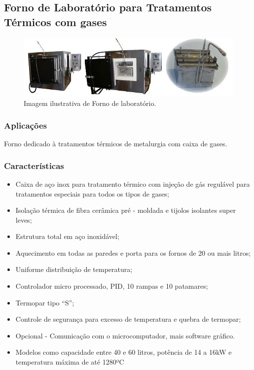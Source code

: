 \subsection{Forno de Laboratório para Tratamentos Térmicos com gases}

\begin{figure}[!h]
	\centering
	\label{forno_gases}
	\includegraphics[keepaspectratio=true,scale=0.8]{figuras/forno_gases.JPG}
	\caption{Imagem ilustrativa de Forno de laboratório.}
\end{figure}

\subsubsection{Aplicações}

Forno dedicado à tratamentos térmicos de metalurgia com caixa de gases.

\subsubsection{Características}

\begin{itemize}
	\item Caixa de aço inox para tratamento térmico com injeção de gás regulável para tratamentos especiais para todos os tipos de gases;
	\item Isolação térmica de fibra cerâmica pré - moldada e tijolos isolantes super leves;
	\item Estrutura total em aço inoxidável;
	\item Aquecimento em todas as paredes e porta para os fornos de 20 ou mais litros;
	\item Uniforme distribuição de temperatura;
	\item Controlador micro processado, PID, 10 rampas e 10 patamares;
	\item Termopar tipo “S”;
	\item Controle de segurança para excesso de temperatura e quebra de termopar;
	\item Opcional - Comunicação com o microcomputador, mais software gráfico.
	\item Modelos como capacidade entre 40 e 60 litros, potência de 14 a 16kW e temperatura máxima de até 1280ºC
	
\end{itemize}


